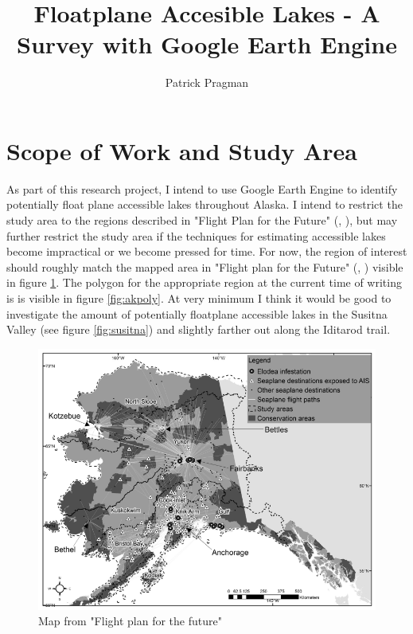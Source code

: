 \documentclass[
    ngerman,american
    ]{scrartcl}
\title{
        Floatplane Accesible Lakes - A Survey with Google Earth Engine
        \\  \Large{\paperSubTitle{\lang}}} %
\author{
        Patrick Pragman
        }
\renewcommand{\cite}[1]{ (\citeauthor{#1}, \citeyear{#1})}
\begin{document}
      \maketitle

        \section{Scope of Work and Study Area}
        
            As part of this research project, I intend to use Google Earth Engine to identify potentially float plane accessible lakes throughout Alaska.  I intend to restrict the study area to the regions described in "Flight Plan for the Future" \cite{schwoerer2022flight}, but may further restrict the study area if the techniques for estimating accessible lakes become impractical or we become pressed for time.  For now, the region of interest should roughly match the mapped area in "Flight plan for the Future" \cite{schwoerer2022flight} visible in figure \ref{fig:tobymap}.  The polygon for the appropriate region at the current time of writing is is visible in figure \ref{fig:akpoly}.  At very minimum I think it would be good to investigate the amount of potentially floatplane accessible lakes in the Susitna Valley (see figure \ref{fig:susitna}) and slightly farther out along the Iditarod trail.



            \begin{figure}
                \centering
                \includegraphics[width=0.75\linewidth]{tobymap.png}
                \caption{Map from "Flight plan for the future"}
                \label{fig:tobymap}
            \end{figure}
\end{document}
